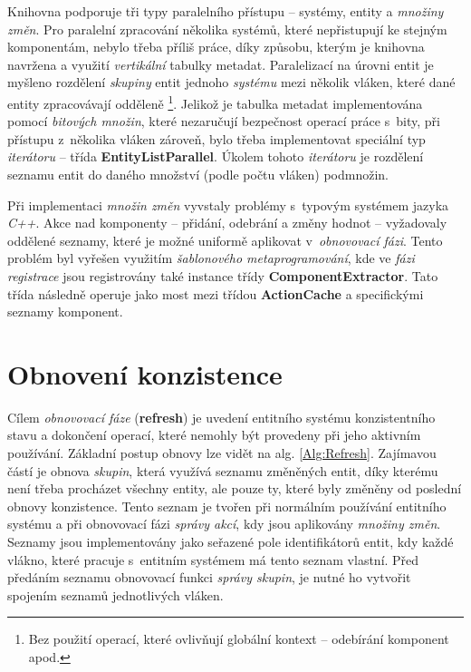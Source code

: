Knihovna podporuje tři typy paralelního přístupu -- systémy, entity a \emph{množiny změn}. Pro paralelní zpracování několika systémů, které nepřistupují ke stejným komponentám, nebylo třeba příliš práce, díky způsobu, kterým je knihovna navržena a využití \emph{vertikální} tabulky metadat. Paralelizací na úrovni entit je myšleno rozdělení \emph{skupiny} entit jednoho \emph{systému} mezi několik vláken, které dané entity zpracovávají odděleně \footnote{Bez použití operací, které ovlivňují globální kontext -- odebírání komponent apod.}. Jelikož je tabulka metadat implementována pomocí \emph{bitových množin}, které nezaručují bezpečnost operací práce s~bity, při přístupu z~několika vláken zároveň, bylo třeba implementovat speciální typ \emph{iterátoru} -- třída \textbf{EntityListParallel}. Úkolem tohoto \emph{iterátoru} je rozdělení seznamu entit do daného množství (podle počtu vláken) podmnožin.

Při implementaci \emph{množin změn} vyvstaly problémy s~typovým systémem jazyka \emph{C++}. Akce nad komponenty -- přidání, odebrání a změny hodnot -- vyžadovaly oddělené seznamy, které je možné uniformě aplikovat v~\emph{obnovovací fázi}. Tento problém byl vyřešen využitím \emph{šablonového metaprogramování}, kde ve \emph{fázi registrace} jsou registrovány také instance třídy \textbf{ComponentExtractor}. Tato třída následně operuje jako most mezi třídou \textbf{ActionCache} a specifickými seznamy komponent.

\section{Obnovení konzistence}

Cílem \emph{obnovovací fáze} (\textbf{refresh}) je uvedení entitního systému konzistentního stavu a dokončení operací, které nemohly být provedeny při jeho aktivním používání. Základní postup obnovy lze vidět na alg. \ref{Alg:Refresh}. Zajímavou částí je obnova \emph{skupin}, která využívá seznamu změněných entit, díky kterému není třeba procházet všechny entity, ale pouze ty, které byly změněny od poslední obnovy konzistence. Tento seznam je tvořen při normálním používání entitního systému a při obnovovací fázi \emph{správy akcí}, kdy jsou aplikovány \emph{množiny změn}. Seznamy jsou implementovány jako seřazené pole identifikátorů entit, kdy každé vlákno, které pracuje s~entitním systémem má tento seznam vlastní. Před předáním seznamu obnovovací funkci \emph{správy skupin}, je nutné ho vytvořit spojením seznamů jednotlivých vláken.

